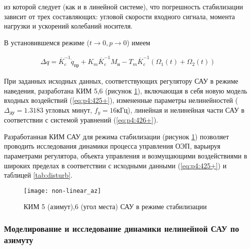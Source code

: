 из которой следует (как и в линейной системе), что погрешность стабилизации зависит от трех составляющих: угловой скорости входного сигнала, момента нагрузки и ускорений колебаний носителя.

В установившемся режиме ($t \longrightarrow 0, p \longrightarrow 0$) имеем\par

\begin{equation}
\label{eq:p4:428+}
\begin{alignedat}{2}
\Delta  q =
\overline K_{c}^{-1} \dot q_{\textit{пр}} + 
K_{m} \overline K_{c}^{-1} M_{\textit{н}} - 
T_{m} \overline K_{c}^{-1} (\Omega_{1}(t) + \Omega_{2}(t))
\end{alignedat}
\end{equation}

При заданных исходных данных, соответствующих регулятору САУ в режиме наведения, разработана КИМ 5,6  (рисунок \ref{fig:non-linear}), включающая в себя новую модель входных воздействий (\ref{eq:p4:425+}), измененные параметры нелинейностей ($\Delta_{\textit{ду}} = 1.3183$ угловых минут, $f_{\textit{y}} = 16 \textit{кГц}$), линейная и нелинейная части САУ в соответствии с системой уравнений (\ref{eq:p4:426+}).\par

Разработанная КИМ САУ для режима стабилизации (рисунок \ref{fig:non-linear}) позволяет проводить исследования динамики процесса управления ОЭП, варьируя параметрами регулятора, объекта управления и возмущающими воздействиями в широких пределах в соответствии с исходными данными (\ref{eq:p4:425+}) и таблицей \ref{tab:disturb}.\par

\begin{figure}[ht]
	\centering
	\texttt{[image: non-linear\_az]} 
	\caption{КИМ 5 (азимут),6 (угол места) САУ в режиме стабилизации}
	\label{fig:non-linear}
\end{figure} 

\subsubsection{Моделирование и исследование динамики нелинейной САУ по азимуту} \label{subsec:ch4/sect6/sub1}

